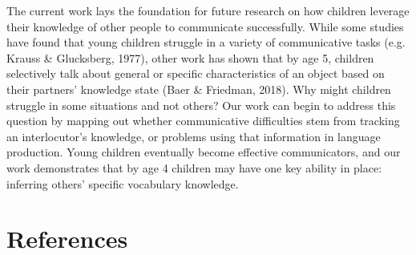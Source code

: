 \documentclass[10pt, letterpaper]{article}
\begin{document}
The current work lays the foundation for future research on how children
leverage their knowledge of other people to communicate successfully.
While some studies have found that young children struggle in a variety
of communicative tasks (e.g. Krauss \& Glucksberg, 1977), other work has
shown that by age 5, children selectively talk about general or specific
characteristics of an object based on their partners' knowledge state
(Baer \& Friedman, 2018). Why might children struggle in some situations
and not others? Our work can begin to address this question by mapping
out whether communicative difficulties stem from tracking an
interlocutor's knowledge, or problems using that information in language
production. Young children eventually become effective communicators,
and our work demonstrates that by age 4 children may have one key
ability in place: inferring others' specific vocabulary knowledge.

\vspace{1em} 

\hypertarget{references}{%
\section{References}\label{references}}

\setlength{\parindent}{-0.1in} 
\setlength{\leftskip}{0.125in}

\noindent
\end{document}
